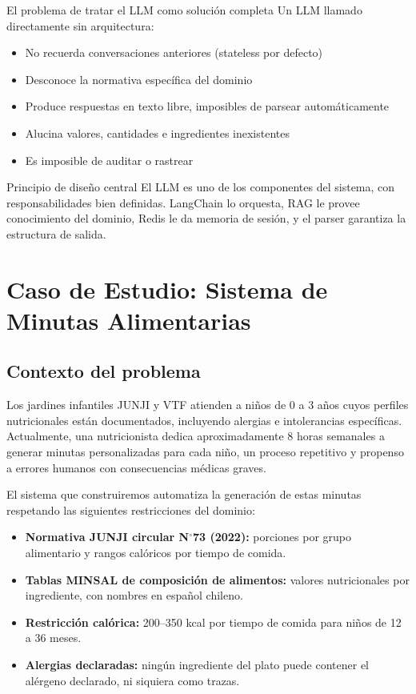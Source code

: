 \documentclass[12pt,a4paper]{article}
\begin{document}
\begin{warnbox}{El problema de tratar el LLM como solución completa}
Un LLM llamado directamente sin arquitectura:
\begin{itemize}[noitemsep]
  \item No recuerda conversaciones anteriores (stateless por defecto)
  \item Desconoce la normativa específica del dominio
  \item Produce respuestas en texto libre, imposibles de parsear automáticamente
  \item Alucina valores, cantidades e ingredientes inexistentes
  \item Es imposible de auditar o rastrear
\end{itemize}
\end{warnbox}

\begin{conceptbox}{Principio de diseño central}
El LLM es uno de los componentes del sistema, con responsabilidades
bien definidas. LangChain lo orquesta, RAG le provee conocimiento del
dominio, Redis le da memoria de sesión, y el parser garantiza la
estructura de salida.
\end{conceptbox}

\section{Caso de Estudio: Sistema de Minutas Alimentarias}

\subsection{Contexto del problema}

Los jardines infantiles JUNJI y VTF atienden a niños de 0 a 3 años cuyos
perfiles nutricionales están documentados, incluyendo alergias e intolerancias
específicas. Actualmente, una nutricionista dedica aproximadamente 8 horas
semanales a generar minutas personalizadas para cada niño, un proceso
repetitivo y propenso a errores humanos con consecuencias médicas graves.

El sistema que construiremos automatiza la generación de estas minutas
respetando las siguientes restricciones del dominio:

\begin{itemize}
  \item \textbf{Normativa JUNJI circular N$^{\circ}$73 (2022):} porciones
    por grupo alimentario y rangos calóricos por tiempo de comida.
  \item \textbf{Tablas MINSAL de composición de alimentos:} valores
    nutricionales por ingrediente, con nombres en español chileno.
  \item \textbf{Restricción calórica:} 200--350 kcal por tiempo de comida
    para niños de 12 a 36 meses.
  \item \textbf{Alergias declaradas:} ningún ingrediente del plato puede
    contener el alérgeno declarado, ni siquiera como trazas.
\end{itemize}
\end{document}
